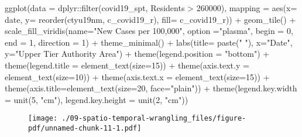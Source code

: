 \documentclass[
  letterpaper,
  krantz2]{style/krantz}
\newenvironment{Shaded}{\begin{snugshade}}{\end{snugshade}}
\newcommand{\AttributeTok}[1]{\textcolor[rgb]{0.40,0.45,0.13}{#1}}
\newcommand{\DecValTok}[1]{\textcolor[rgb]{0.68,0.00,0.00}{#1}}
\newcommand{\FunctionTok}[1]{\textcolor[rgb]{0.28,0.35,0.67}{#1}}
\newcommand{\NormalTok}[1]{\textcolor[rgb]{0.00,0.23,0.31}{#1}}
\newcommand{\SpecialCharTok}[1]{\textcolor[rgb]{0.37,0.37,0.37}{#1}}
\newcommand{\StringTok}[1]{\textcolor[rgb]{0.13,0.47,0.30}{#1}}
\begin{document}
\begin{Shaded}
\begin{Highlighting}[]
\FunctionTok{ggplot}\NormalTok{(}\AttributeTok{data =}\NormalTok{ dplyr}\SpecialCharTok{::}\FunctionTok{filter}\NormalTok{(covid19\_spt, Residents }\SpecialCharTok{\textgreater{}} \DecValTok{260000}\NormalTok{), }
           \AttributeTok{mapping =} \FunctionTok{aes}\NormalTok{(}\AttributeTok{x=}\NormalTok{ date, }\AttributeTok{y=} \FunctionTok{reorder}\NormalTok{(ctyu19nm, c\_covid19\_r), }\AttributeTok{fill=}\NormalTok{ c\_covid19\_r)) }\SpecialCharTok{+}
  \FunctionTok{geom\_tile}\NormalTok{() }\SpecialCharTok{+}
  \FunctionTok{scale\_fill\_viridis}\NormalTok{(}\AttributeTok{name=}\StringTok{"New Cases per 100,000"}\NormalTok{, }\AttributeTok{option =}\StringTok{"plasma"}\NormalTok{, }\AttributeTok{begin =} \DecValTok{0}\NormalTok{, }\AttributeTok{end =} \DecValTok{1}\NormalTok{, }\AttributeTok{direction =} \DecValTok{1}\NormalTok{) }\SpecialCharTok{+}
  \FunctionTok{theme\_minimal}\NormalTok{() }\SpecialCharTok{+} 
  \FunctionTok{labs}\NormalTok{(}\AttributeTok{title=} \FunctionTok{paste}\NormalTok{(}\StringTok{" "}\NormalTok{), }\AttributeTok{x=}\StringTok{"Date"}\NormalTok{, }\AttributeTok{y=}\StringTok{"Upper Tier Authority Area"}\NormalTok{) }\SpecialCharTok{+}
  \FunctionTok{theme}\NormalTok{(}\AttributeTok{legend.position =} \StringTok{"bottom"}\NormalTok{) }\SpecialCharTok{+}
  \FunctionTok{theme}\NormalTok{(}\AttributeTok{legend.title =} \FunctionTok{element\_text}\NormalTok{(}\AttributeTok{size=}\DecValTok{15}\NormalTok{)) }\SpecialCharTok{+}
  \FunctionTok{theme}\NormalTok{(}\AttributeTok{axis.text.y =} \FunctionTok{element\_text}\NormalTok{(}\AttributeTok{size=}\DecValTok{10}\NormalTok{)) }\SpecialCharTok{+}
  \FunctionTok{theme}\NormalTok{(}\AttributeTok{axis.text.x =} \FunctionTok{element\_text}\NormalTok{(}\AttributeTok{size=}\DecValTok{15}\NormalTok{)) }\SpecialCharTok{+}
  \FunctionTok{theme}\NormalTok{(}\AttributeTok{axis.title=}\FunctionTok{element\_text}\NormalTok{(}\AttributeTok{size=}\DecValTok{20}\NormalTok{, }\AttributeTok{face=}\StringTok{"plain"}\NormalTok{)) }\SpecialCharTok{+}
  \FunctionTok{theme}\NormalTok{(}\AttributeTok{legend.key.width =} \FunctionTok{unit}\NormalTok{(}\DecValTok{5}\NormalTok{, }\StringTok{"cm"}\NormalTok{), }\AttributeTok{legend.key.height =} \FunctionTok{unit}\NormalTok{(}\DecValTok{2}\NormalTok{, }\StringTok{"cm"}\NormalTok{))}
\end{Highlighting}
\end{Shaded}

\begin{figure}[H]

{\centering \texttt{[image: ./09-spatio-temporal-wrangling\_files/figure-pdf/unnamed-chunk-11-1.pdf]}

}

\end{figure}
\end{document}
